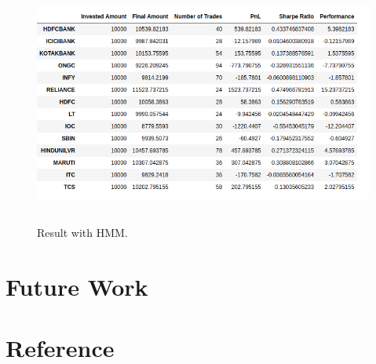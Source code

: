 \documentclass{report}
\begin{document}
\begin{figure}[h!]
  \includegraphics[width=15cm, height=8cm]{Result_With_HMM.png}
  \caption{Result with HMM.}
  \label{fig:hmm}
\end{figure}


\chapter{Future Work}
\chapter{Reference}
\end{document}
